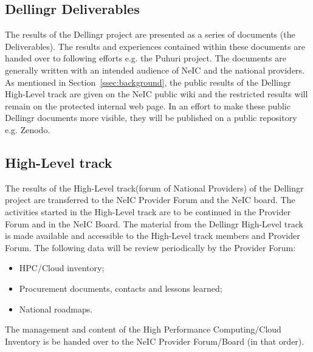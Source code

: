\documentclass{article}
\newcommand{\dell}{Dellingr\xspace}
\newcommand{\np}{national provider\xspace}
\newcommand{\nps}{\np{s}\xspace}
\newcommand{\HLT}{High-Level track\xspace}
\begin{document}
\subsection{\dell Deliverables}
\label{ssec:deliverables}

The results of the \dell project are presented as a series of documents (the Deliverables).
The results and experiences contained within these documents are handed over to following efforts e.g. the Puhuri project.
The documents are generally written with an intended audience of NeIC and the \nps.
As mentioned in Section~\ref{ssec:background}, the public results of the \dell \HLT are given on the NeIC public wiki
and the restricted results will remain on the protected internal web page.
In an effort to make these public \dell documents more visible, they will be published on a public repository e.g. Zenodo.

\subsection{\HLT}
\label{ssec:hlt}

The results of the \HLT (forum of National Providers) of the \dell project are transferred to the NeIC Provider Forum and the NeIC board.
The activities started in the \HLT are to be continued in the Provider Forum and in the NeIC Board.
The material from the \dell \HLT is made available and accessible to the \HLT members and Provider Forum.
The following data will be review periodically by the Provider Forum:
\begin{itemize}
\item HPC/Cloud inventory;
\item Procurement documents, contacts and lessons learned;
\item National roadmaps.
\end{itemize}
The management and content of the High Performance Computing/Cloud Inventory is be handed over to the NeIC Provider Forum/Board (in that order).
\end{document}
